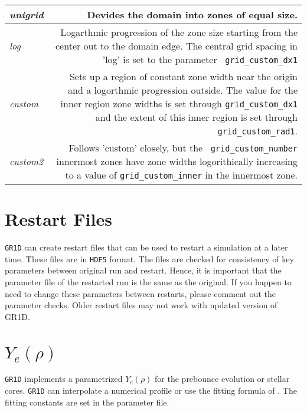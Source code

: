 \documentclass[10pt,nofootinbib]{article}
\newcommand{\code}[1]{\texttt{#1}}
\begin{document}
\begin{tabular}{lr}
\emph{unigrid}&\parbox[t]{13cm}{Devides the domain into zones of equal
  size.}\\ 
\hline
\emph{log}&\parbox[t]{13cm}{Logarthmic progression of the zone size
  starting from the center out to the domain edge.  The central grid
  spacing in 'log' is set to the parameter {\tt
    grid\_custom\_dx1}}\\ 

\hline

\emph{custom}&\parbox[t]{13cm}{Sets up a region of constant zone width
  near the origin and a logorthmic progression outside.  The value for
  the inner region zone widths is set through {\tt grid\_custom\_dx1}
  and the extent of this inner region is set through {\tt
    grid\_custom\_rad1}.}\\

\hline

\emph{custom2}&\parbox[t]{13cm}{Follows 'custom' closely, but the {\tt
    grid\_custom\_number} innermost zones have zone widths
  logorithically increasing to a value of {\tt grid\_custom\_inner} in
  the innermost zone.  }\\

\end{tabular}




\section{Restart Files}
\code{GR1D} can create restart files that can be used to restart a
simulation at a later time.  These files are in \code{HDF5} format.
The files are checked for consistency of key parameters between
original run and restart. Hence, it is important that the parameter
file of the restarted run is the same as the original. If you happen
to need to change these parameters between restarts, please comment
out the parameter checks.  Older restart files may not work with
updated version of GR1D.

\section{$Y_e(\rho)$}
\label{sec:yeofrhofit}
\code{GR1D} implements a parametrized $Y_e(\rho)$ for the prebounce
evolution or stellar cores.  \code{GR1D} can interpolate a numerical
profile or use the fitting formula of \cite{liebendoerfer:05fakenu}.  The
fitting constants are set in the parameter file.
\end{document}
